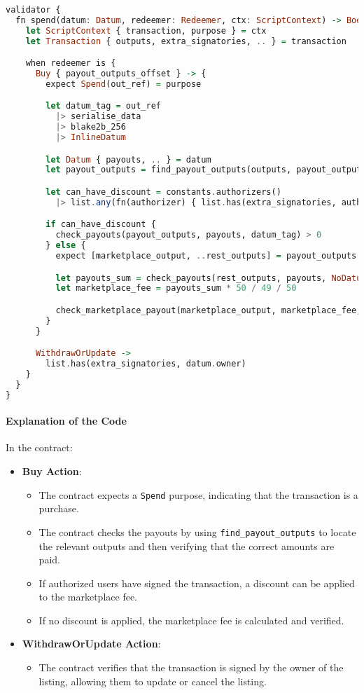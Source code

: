 \begin{lstlisting}[language=haskell, caption=Aiken Marketplace Contract Logic]
validator {
  fn spend(datum: Datum, redeemer: Redeemer, ctx: ScriptContext) -> Bool {
    let ScriptContext { transaction, purpose } = ctx
    let Transaction { outputs, extra_signatories, .. } = transaction

    when redeemer is {
      Buy { payout_outputs_offset } -> {
        expect Spend(out_ref) = purpose

        let datum_tag = out_ref
          |> serialise_data
          |> blake2b_256
          |> InlineDatum

        let Datum { payouts, .. } = datum
        let payout_outputs = find_payout_outputs(outputs, payout_outputs_offset)

        let can_have_discount = constants.authorizers()
          |> list.any(fn(authorizer) { list.has(extra_signatories, authorizer) })

        if can_have_discount {
          check_payouts(payout_outputs, payouts, datum_tag) > 0
        } else {
          expect [marketplace_output, ..rest_outputs] = payout_outputs

          let payouts_sum = check_payouts(rest_outputs, payouts, NoDatum)
          let marketplace_fee = payouts_sum * 50 / 49 / 50

          check_marketplace_payout(marketplace_output, marketplace_fee, datum_tag)
        }
      }

      WithdrawOrUpdate -> 
        list.has(extra_signatories, datum.owner)
    }
  }
}
\end{lstlisting}

\paragraph{Explanation of the Code}
In the contract:
\begin{itemize}
    \item \textbf{Buy Action}: 
        \begin{itemize}
            \item The contract expects a \texttt{Spend} purpose, indicating that the transaction is a purchase.
            \item The contract checks the payouts by using \texttt{find\_payout\_outputs} to locate the relevant outputs and then verifying that the correct amounts are paid.
            \item If authorized users have signed the transaction, a discount can be applied to the marketplace fee.
            \item If no discount is applied, the marketplace fee is calculated and verified.
        \end{itemize}
    \item \textbf{WithdrawOrUpdate Action}: 
        \begin{itemize}
            \item The contract verifies that the transaction is signed by the owner of the listing, allowing them to update or cancel the listing.
        \end{itemize}
\end{itemize}

